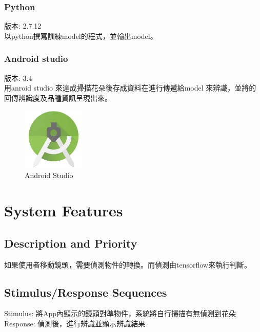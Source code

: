 \documentclass{scrreprt}
\begin{document}
\subsection{Python}
\begin{CJK}{UTF8}{bkai}
版本: 2.7.12 \\
以python撰寫訓練model的程式，並輸出model。
\end{CJK}

\subsection{Android studio}
\begin{CJK}{UTF8}{bkai}
版本: 3.4 \\
		用anroid studio 來達成掃描花朵後存成資料在進行傳遞給model 來辨識，並將的回傳辨識度及品種資訊呈現出來。
\end{CJK}
\begin{figure}[h]
\begin{center}
\includegraphics[width=3cm]{androidstudioicon.jpg}
\end{center}
\caption{Android Studio}
\end{figure}


\chapter{System Features}

\section{Description and Priority}
\begin{CJK}{UTF8}{bkai}
		如果使用者移動鏡頭，需要偵測物件的轉換。而偵測由tensorflow來執行判斷。
\end{CJK}

\section{Stimulus/Response Sequences}
\begin{CJK}{UTF8}{bkai}
		Stimulus: 	將App內顯示的鏡頭對準物件，系統將自行掃描有無偵測到花朵 \\
		Response:  偵測後，進行辨識並顯示辨識結果
\end{CJK}
\end{document}
